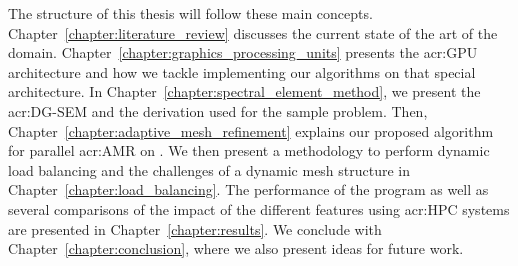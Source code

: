 The structure of this thesis will follow these main concepts.
Chapter~\ref{chapter:literature_review} discusses the current state of the art of the domain.
Chapter~\ref{chapter:graphics_processing_units} presents the \acrshort{acr:GPU} architecture and how
we tackle implementing our algorithms on that special architecture. In
Chapter~\ref{chapter:spectral_element_method}, we present the \acrshort{acr:DG-SEM} and the
derivation used for the sample problem. Then, Chapter~\ref{chapter:adaptive_mesh_refinement}
explains our proposed algorithm for parallel \acrshort{acr:AMR} on . We then
present a methodology to perform dynamic load balancing and the challenges of a dynamic mesh
structure in Chapter~\ref{chapter:load_balancing}. The performance of the program as well as several
comparisons of the impact of the different features using \acrshort{acr:HPC} systems are presented
in Chapter~\ref{chapter:results}. We conclude with Chapter~\ref{chapter:conclusion}, where we also
present ideas for future work.
